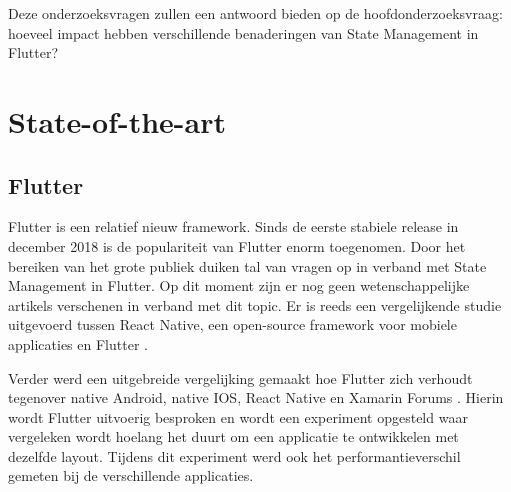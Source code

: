 Deze onderzoeksvragen zullen een antwoord bieden op de hoofdonderzoeksvraag: hoeveel impact hebben verschillende benaderingen van State Management in Flutter?


\section{State-of-the-art}
\label{sec:state-of-the-art}
\subsection*{Flutter}
Flutter is een relatief nieuw framework. Sinds de eerste stabiele release in december 2018 is de populariteit
van Flutter enorm toegenomen. Door het bereiken van het grote publiek duiken tal van vragen op in verband met 
State Management in Flutter. Op dit moment zijn er nog geen wetenschappelijke artikels verschenen in verband met dit topic.
Er is reeds een vergelijkende studie uitgevoerd tussen React Native, een open-source framework voor mobiele applicaties en Flutter \autocite{Wu2018}.

Verder werd een uitgebreide vergelijking gemaakt hoe Flutter zich verhoudt tegenover native Android, native IOS,
React Native en Xamarin Forums \autocite{Coninck2019}.
Hierin wordt Flutter uitvoerig besproken en wordt een experiment opgesteld waar vergeleken wordt hoelang het duurt
om een applicatie te ontwikkelen met dezelfde layout. Tijdens dit experiment werd ook het performantieverschil gemeten bij de verschillende applicaties. 

%


